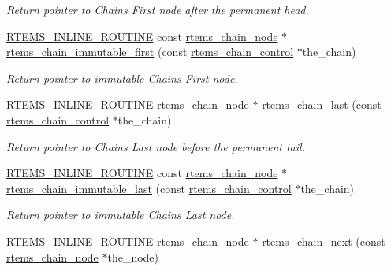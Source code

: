 \begin{DoxyCompactItemize}
\begin{DoxyCompactList}\small\item\em Return pointer to Chain\textquotesingle{}s First node after the permanent head. \end{DoxyCompactList}\item 
\mbox{\hyperlink{group__RTEMSScoreBaseDefs_gac216239df231d5dbd15e3520b0b9313f}{R\+T\+E\+M\+S\+\_\+\+I\+N\+L\+I\+N\+E\+\_\+\+R\+O\+U\+T\+I\+NE}} const \mbox{\hyperlink{structChain__Node__struct}{rtems\+\_\+chain\+\_\+node}} $\ast$ \mbox{\hyperlink{group__ClassicChains_ga8c770afb5c32feff31d9052f7196b1d7}{rtems\+\_\+chain\+\_\+immutable\+\_\+first}} (const \mbox{\hyperlink{unionChain__Control}{rtems\+\_\+chain\+\_\+control}} $\ast$the\+\_\+chain)
\begin{DoxyCompactList}\small\item\em Return pointer to immutable Chain\textquotesingle{}s First node. \end{DoxyCompactList}\item 
\mbox{\hyperlink{group__RTEMSScoreBaseDefs_gac216239df231d5dbd15e3520b0b9313f}{R\+T\+E\+M\+S\+\_\+\+I\+N\+L\+I\+N\+E\+\_\+\+R\+O\+U\+T\+I\+NE}} \mbox{\hyperlink{structChain__Node__struct}{rtems\+\_\+chain\+\_\+node}} $\ast$ \mbox{\hyperlink{group__ClassicChains_gacf4f04f80c5d9e867686087fc0066006}{rtems\+\_\+chain\+\_\+last}} (const \mbox{\hyperlink{unionChain__Control}{rtems\+\_\+chain\+\_\+control}} $\ast$the\+\_\+chain)
\begin{DoxyCompactList}\small\item\em Return pointer to Chain\textquotesingle{}s Last node before the permanent tail. \end{DoxyCompactList}\item 
\mbox{\hyperlink{group__RTEMSScoreBaseDefs_gac216239df231d5dbd15e3520b0b9313f}{R\+T\+E\+M\+S\+\_\+\+I\+N\+L\+I\+N\+E\+\_\+\+R\+O\+U\+T\+I\+NE}} const \mbox{\hyperlink{structChain__Node__struct}{rtems\+\_\+chain\+\_\+node}} $\ast$ \mbox{\hyperlink{group__ClassicChains_ga9bfc86b96b34e3b890397bbf7fe2f66f}{rtems\+\_\+chain\+\_\+immutable\+\_\+last}} (const \mbox{\hyperlink{unionChain__Control}{rtems\+\_\+chain\+\_\+control}} $\ast$the\+\_\+chain)
\begin{DoxyCompactList}\small\item\em Return pointer to immutable Chain\textquotesingle{}s Last node. \end{DoxyCompactList}\item 
\mbox{\hyperlink{group__RTEMSScoreBaseDefs_gac216239df231d5dbd15e3520b0b9313f}{R\+T\+E\+M\+S\+\_\+\+I\+N\+L\+I\+N\+E\+\_\+\+R\+O\+U\+T\+I\+NE}} \mbox{\hyperlink{structChain__Node__struct}{rtems\+\_\+chain\+\_\+node}} $\ast$ \mbox{\hyperlink{group__ClassicChains_ga53a35170adf0ff9075a2e04560777eab}{rtems\+\_\+chain\+\_\+next}} (const \mbox{\hyperlink{structChain__Node__struct}{rtems\+\_\+chain\+\_\+node}} $\ast$the\+\_\+node)

\end{DoxyCompactItemize}
